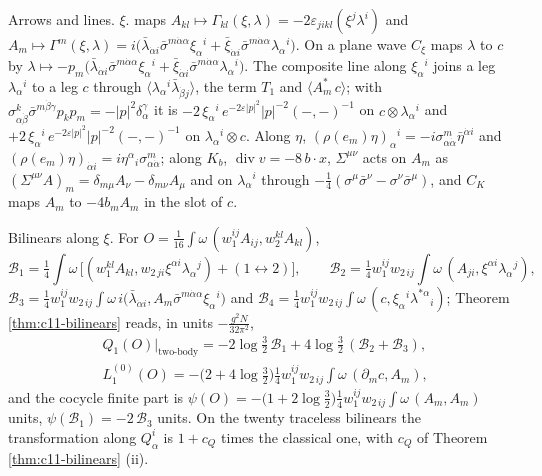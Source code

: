 \item Arrows and lines. $\xi.$ maps $A_{kl}\mapsto\Gamma_{kl}(\xi,\lambda)=-2\varepsilon_{jikl}(\xi^j\lambda^i)$ and $A_m\mapsto\Gamma^m(\xi,\lambda)=i\big(\bar\lambda_{\dot\alpha i}\bar\sigma^{m\dot\alpha\alpha}\xi_\alpha{}^i+\bar\xi_{\dot\alpha i}\bar\sigma^{m\dot\alpha\alpha}\lambda_\alpha{}^i\big)$. On a plane wave $C_\xi$ maps $\lambda$ to $c$ by $\lambda\mapsto-p_m\big(\bar\lambda_{\dot\alpha i}\bar\sigma^{m\dot\alpha\alpha}\xi_\alpha{}^i+\bar\xi_{\dot\alpha i}\bar\sigma^{m\dot\alpha\alpha}\lambda_\alpha{}^i\big)$. The composite line along $\xi_\alpha{}^i$ joins a leg $\lambda_\alpha{}^i$ to a leg $c$ through $\langle\lambda_\alpha{}^i\bar\lambda_{\dot\beta j}\rangle$, the term $T_1$ and $\langle A^*_m\,c\rangle$; with $\sigma^k_{\alpha\dot\beta}\bar\sigma^{m\dot\beta\gamma}p_kp_m=-|p|^2\delta_\alpha^\gamma$ it is $-2\,\xi_\alpha{}^i\,e^{-2\varepsilon|p|^2}|p|^{-2}(-,-)^{-1}$ on $c\otimes\lambda_\alpha{}^i$ and $+2\,\xi_\alpha{}^i\,e^{-2\varepsilon|p|^2}|p|^{-2}(-,-)^{-1}$ on $\lambda_\alpha{}^i\otimes c$. Along $\eta$, $(\rho(e_m)\eta)_\alpha{}^i=-i\sigma^m_{\alpha\dot\alpha}\bar\eta^{\dot\alpha i}$ and $(\rho(e_m)\eta)_{\dot\alpha i}=i\eta^\alpha{}_i\sigma^m_{\alpha\dot\alpha}$; along $K_b$, $\operatorname{div}v=-8\,b\cdot x$, $\Sigma^{\mu\nu}$ acts on $A_m$ as $(\Sigma^{\mu\nu}A)_m=\delta_{m\mu}A_\nu-\delta_{m\nu}A_\mu$ and on $\lambda_\alpha{}^i$ through $-\tfrac14(\sigma^\mu\bar\sigma^\nu-\sigma^\nu\bar\sigma^\mu)$, and $C_K$ maps $A_m$ to $-4b_mA_m$ in the slot of $c$.
\item Bilinears along $\xi$. For $O=\tfrac1{16}\int\omega\,(w_1^{ij}A_{ij},w_2^{kl}A_{kl})$,
\[
\mathcal B_1=\tfrac14\int\omega\,\big[(w_1^{kl}A_{kl},w_{2\,ji}\xi^{\alpha i}\lambda_\alpha{}^j)+(1\leftrightarrow2)\big],\qquad \mathcal B_2=\tfrac14w_1^{ij}w_{2\,ij}\int\omega\,(A_{ji},\xi^{\alpha i}\lambda_\alpha{}^j),
\]
$\mathcal B_3=\tfrac14w_1^{ij}w_{2\,ij}\int\omega\,i\big(\bar\lambda_{\dot\alpha i},A_m\bar\sigma^{m\dot\alpha\alpha}\xi_\alpha{}^i\big)$ and $\mathcal B_4=\tfrac14w_1^{ij}w_{2\,ij}\int\omega\,(c,\xi_\alpha{}^i\lambda^{*\alpha}{}_i)$; Theorem \ref{thm:c11-bilinears} reads, in units $-\frac{g^2N}{32\pi^2}$,
\[
\begin{aligned}
&Q_1(O)\big|_{\text{two-body}}=-2\log\tfrac32\,\mathcal B_1+4\log\tfrac32\,(\mathcal B_2+\mathcal B_3),\\
&L_1^{(0)}(O)=-\big(2+4\log\tfrac32\big)\tfrac14w_1^{ij}w_{2\,ij}\int\omega\,(\partial_mc,A_m),
\end{aligned}
\]
and the cocycle finite part is $\psi(O)=-\big(1+2\log\tfrac32\big)\tfrac14w_1^{ij}w_{2\,ij}\int\omega\,(A_m,A_m)$ units, $\psi(\mathcal B_1)=-2\,\mathcal B_3$ units. On the twenty traceless bilinears the transformation along $Q^i_\alpha$ is $1+c_Q$ times the classical one, with $c_Q$ of Theorem \ref{thm:c11-bilinears} (ii).
